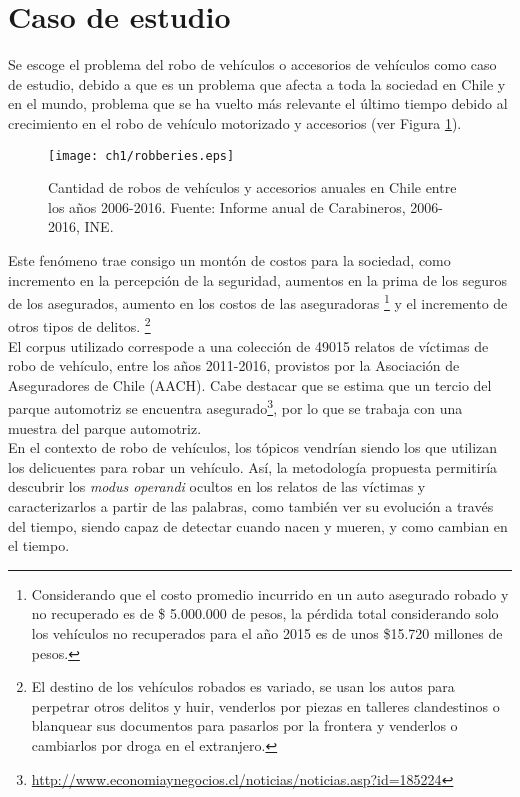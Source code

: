 \section{Caso de estudio}

Se escoge el problema del robo de vehículos o accesorios de vehículos como caso de estudio, debido a que es un problema que afecta a toda la sociedad en Chile y en el mundo, problema que se ha vuelto más relevante el último tiempo debido al crecimiento en el robo de vehículo motorizado y accesorios (ver Figura \ref{fig:antecedente}).\\ 

\begin{figure}
    \texttt{[image: ch1/robberies.eps]} 
    \caption{Cantidad de robos de vehículos y accesorios anuales en Chile entre los años 2006-2016. Fuente: Informe anual de Carabineros, 2006-2016, INE.} 
    \label{fig:antecedente}
\end{figure}

Este fenómeno trae consigo un montón de costos para la sociedad, como incremento en la percepción de la seguridad, aumentos en la prima de los seguros de los asegurados, aumento en los costos de las aseguradoras \footnote{Considerando que el costo promedio incurrido en un auto asegurado robado y no recuperado es de \$ 5.000.000 de pesos, la pérdida total considerando solo los vehículos no recuperados para el año 2015 es de unos \$15.720 millones de pesos.} y el incremento de otros tipos de delitos. \footnote{El destino de los vehículos robados es variado, se usan los autos para perpetrar otros delitos y huir, venderlos por piezas en talleres clandestinos o blanquear sus documentos para pasarlos por la frontera y venderlos o cambiarlos por droga en el extranjero.}\\

El corpus utilizado correspode a una colección de 49015 relatos de víctimas de robo de vehículo, entre los años 2011-2016, provistos por la Asociación de Aseguradores de Chile (AACH). Cabe destacar que se estima que un tercio del parque automotriz se encuentra asegurado\footnote{\href{http://www.economiaynegocios.cl/noticias/noticias.asp?id=185224}{http://www.economiaynegocios.cl/noticias/noticias.asp?id=185224}}, por lo que se trabaja con una muestra del parque automotriz.\\

En el contexto de robo de vehículos, los tópicos vendrían siendo los  que utilizan los delicuentes para robar un vehículo. Así, la metodología propuesta permitiría descubrir los \textit{modus operandi} ocultos en los relatos de las víctimas y caracterizarlos a partir de las palabras, como también ver su evolución a través del tiempo, siendo capaz de detectar cuando nacen y mueren, y como cambian en el tiempo.\\

